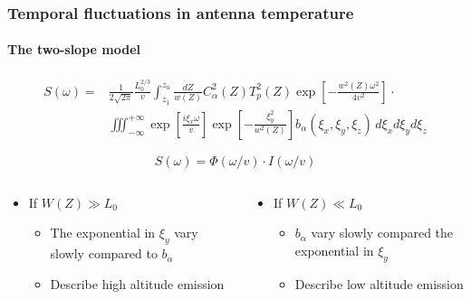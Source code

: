 \documentclass[aspectratio=169]{beamer}
\begin{document}
\begin{frame}
    \frametitle{Temporal fluctuations in antenna temperature}
    \framesubtitle{The two-slope model}
    \begin{equation}
        \begin{split}
            S(\omega) = &\frac{1}{2\sqrt{2\pi}}\frac{L^{2/3}_0}{v}\int_{z_1}^{z_u}\frac{dZ}{w(Z)}C_\alpha^2(Z)T^2_p(Z)\exp\left[-\frac{w^2(Z)\omega^2}{4v^2}\right]\cdot \\
            &\iiint_{-\infty}^{+\infty} \exp\left[\frac{i \xi_x \omega}{v}\right]\exp\left[-\frac{\xi_y^2}{w^2(Z)}\right]b_\alpha(\xi_x, \xi_y, \xi_z)\,d\xi_xd\xi_yd\xi_z
        \end{split}
    \end{equation}

    \begin{equation}
        S(\omega) = \Phi(\omega/v) \cdot I(\omega/v)
    \end{equation}

    \begin{columns}
        \begin{column}{0.5\textwidth}
            \begin{itemize}
                \item If $W(Z) \gg L_0$
                \begin{itemize}
                    \item The exponential in $\xi_y$ vary slowly compared to $b_\alpha$
                    \item Describe high altitude emission
                \end{itemize}
            \end{itemize}
        \end{column}
        \begin{column}{0.5\textwidth}
            \begin{itemize}
                \item If $W(Z) \ll L_0$
                \begin{itemize}
                    \item $b_\alpha$ vary slowly compared the exponential in $\xi_y$
                    \item Describe low altitude emission
                \end{itemize}

            \end{itemize}
        \end{column}

    \end{columns}

\end{frame}
\end{document}
